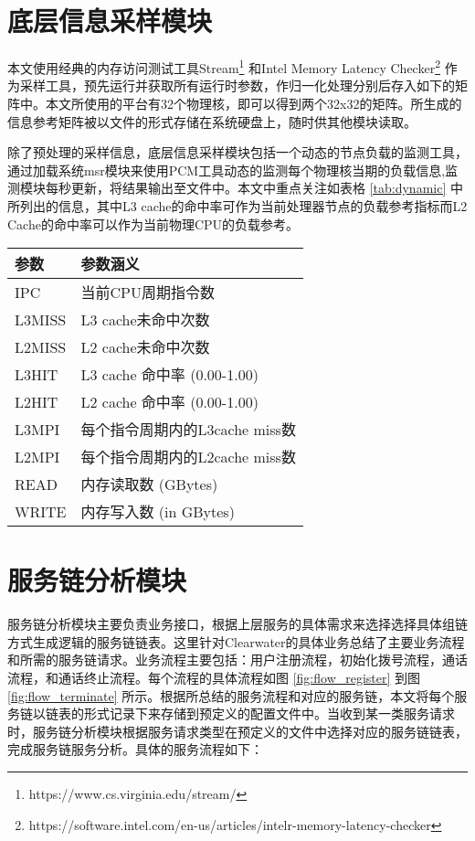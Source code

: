 \section{底层信息采样模块}
本文使用经典的内存访问测试工具Stream\footnote{https://www.cs.virginia.edu/stream/} 和Intel Memory Latency Checker\footnote{https://software.intel.com/en-us/articles/intelr-memory-latency-checker} 作为采样工具，预先运行并获取所有运行时参数，作归一化处理分别后存入如下的矩阵中。本文所使用的平台有32个物理核，即可以得到两个32x32的矩阵。所生成的信息参考矩阵被以文件的形式存储在系统硬盘上，随时供其他模块读取。

除了预处理的采样信息，底层信息采样模块包括一个动态的节点负载的监测工具，通过加载系统msr模块来使用PCM工具动态的监测每个物理核当期的负载信息,监测模块每秒更新，将结果输出至文件中。本文中重点关注如表格 \ref{tab:dynamic} 中所列出的信息，其中L3 cache的命中率可作为当前处理器节点的负载参考指标而L2 Cache的命中率可以作为当前物理CPU的负载参考。

\begin{table}[!htb]
	\centering
	\begin{tabular}{ | l | p{6cm} |}\hline
		\textbf{参数} &							 \textbf{参数涵义}  				\\ 	\hline
		IPC   & 当前CPU周期指令数\\ \hline
		L3MISS & L3 cache未命中次数\\ \hline
		L2MISS & L2 cache未命中次数\\ \hline
		L3HIT & L3 cache 命中率 (0.00-1.00)\\ \hline
		L2HIT & L2 cache 命中率 (0.00-1.00)\\ \hline
		L3MPI & 每个指令周期内的L3cache miss数\\ \hline
		L2MPI & 每个指令周期内的L2cache miss数\\ \hline
		READ  & 内存读取数 (GBytes)\\ \hline
		WRITE & 内存写入数 (in GBytes)\\ \hline
	\end{tabular}
\end{table}


\section{服务链分析模块}
服务链分析模块主要负责业务接口，根据上层服务的具体需求来选择选择具体组链方式生成逻辑的服务链链表。这里针对Clearwater的具体业务总结了主要业务流程和所需的服务链请求。业务流程主要包括：用户注册流程，初始化拨号流程，通话流程，和通话终止流程。每个流程的具体流程如图 \ref{fig:flow_register} 到图 \ref{fig:flow_terminate} 所示。根据所总结的服务流程和对应的服务链，本文将每个服务链以链表的形式记录下来存储到预定义的配置文件中。当收到某一类服务请求时，服务链分析模块根据服务请求类型在预定义的文件中选择对应的服务链链表，完成服务链服务分析。具体的服务流程如下：

